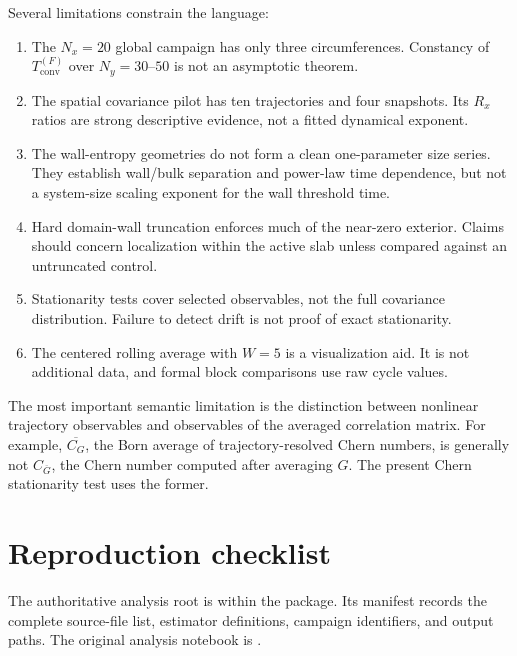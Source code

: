 \documentclass[aps,prb,twocolumn,nofootinbib,superscriptaddress,floatfix]{revtex4-2}
\newcommand{\Tconv}{T_{\mathrm{conv}}}
\begin{document}
Several limitations constrain the language:
\begin{enumerate}
  \item The $N_x=20$ global campaign has only three circumferences.  Constancy
  of $\Tconv^{(F)}$ over $N_y=30$--$50$ is not an asymptotic theorem.
  \item The spatial covariance pilot has ten trajectories and four snapshots.
  Its $R_x$ ratios are strong descriptive evidence, not a fitted dynamical
  exponent.
  \item The wall-entropy geometries do not form a clean one-parameter size
  series.  They establish wall/bulk separation and power-law time dependence,
  but not a system-size scaling exponent for the wall threshold time.
  \item Hard domain-wall truncation enforces much of the near-zero exterior.
  Claims should concern localization within the active slab unless compared
  against an untruncated control.
  \item Stationarity tests cover selected observables, not the full covariance
  distribution.  Failure to detect drift is not proof of exact stationarity.
  \item The centered rolling average with $W=5$ is a visualization aid.  It is
  not additional data, and formal block comparisons use raw cycle values.
\end{enumerate}

The most important semantic limitation is the distinction between nonlinear
trajectory observables and observables of the averaged correlation matrix.
For example, $\overline{C_G}$, the Born average of trajectory-resolved Chern
numbers, is generally not $C_{\overline G}$, the Chern number computed after
averaging $G$.  The present Chern stationarity test uses the former.

\section{Reproduction checklist}
\label{sec:reproduction}

The authoritative analysis root is
within the  package.  Its manifest records
the complete source-file list, estimator definitions, campaign identifiers,
and output paths.  The original analysis notebook is
.
\end{document}
